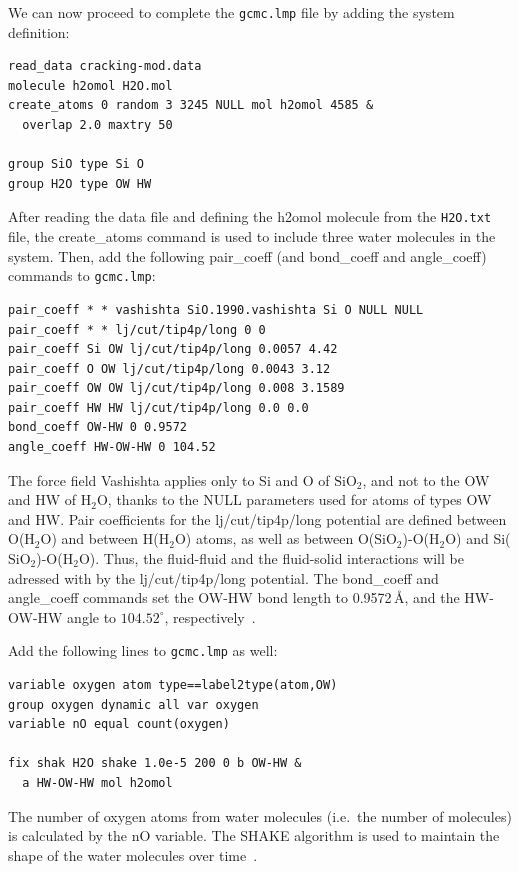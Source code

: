 \documentclass[9pt,tutorial]{livecoms}
\newcommand{\lmpcmd}[1]{\hspace{0pt}\colorbox{listing}{\textcolor{command}{\small{#1}}}\hspace{0pt}} %
\newcommand{\flecmd}[1]{\textcolor{command}{\texttt{#1}}} %
\begin{document}
We can now proceed to complete the \flecmd{gcmc.lmp} file by adding the system definition:
\begin{lstlisting}
read_data cracking-mod.data
molecule h2omol H2O.mol
create_atoms 0 random 3 3245 NULL mol h2omol 4585 &
  overlap 2.0 maxtry 50

group SiO type Si O
group H2O type OW HW
\end{lstlisting}
After reading the data file and defining the \lmpcmd{h2omol} molecule from the \flecmd{H2O.txt}
file, the \lmpcmd{create\_atoms} command is used to include three water molecules
in the system.  Then, add the following \lmpcmd{pair\_coeff} (and
\lmpcmd{bond\_coeff} and \lmpcmd{angle\_coeff}) commands
to \flecmd{gcmc.lmp}:
\begin{lstlisting}
pair_coeff * * vashishta SiO.1990.vashishta Si O NULL NULL
pair_coeff * * lj/cut/tip4p/long 0 0
pair_coeff Si OW lj/cut/tip4p/long 0.0057 4.42
pair_coeff O OW lj/cut/tip4p/long 0.0043 3.12
pair_coeff OW OW lj/cut/tip4p/long 0.008 3.1589
pair_coeff HW HW lj/cut/tip4p/long 0.0 0.0
bond_coeff OW-HW 0 0.9572
angle_coeff HW-OW-HW 0 104.52
\end{lstlisting}
The force field Vashishta applies only to \lmpcmd{Si} and \lmpcmd{O} of $\text{SiO}_2$,
and not to the \lmpcmd{OW} and \lmpcmd{HW} of $\text{H}_2\text{O}$, thanks to the \lmpcmd{NULL} parameters
used for atoms of types \lmpcmd{OW} and \lmpcmd{HW}.  Pair coefficients for the \lmpcmd{lj/cut/tip4p/long}
potential are defined between O($\text{H}_2\text{O}$) and between H($\text{H}_2\text{O}$)
atoms, as well as between O($\text{SiO}_2$)-O($\text{H}_2\text{O}$) and
Si($\text{SiO}_2$)-O($\text{H}_2\text{O}$). Thus,  the fluid-fluid and the
fluid-solid interactions will be adressed with by the \lmpcmd{lj/cut/tip4p/long} potential.
The \lmpcmd{bond\_coeff} and \lmpcmd{angle\_coeff} commands set the \lmpcmd{OW-HW}
bond length to 0.9572\,\AA, and the \lmpcmd{HW-OW-HW}
angle to $104.52^\circ$, respectively~\cite{abascal2005general}.

Add the following lines to \flecmd{gcmc.lmp} as well:
\begin{lstlisting}
variable oxygen atom type==label2type(atom,OW)
group oxygen dynamic all var oxygen
variable nO equal count(oxygen)

fix shak H2O shake 1.0e-5 200 0 b OW-HW &
  a HW-OW-HW mol h2omol
\end{lstlisting}
The number of oxygen atoms from water molecules (i.e.~the number of molecules)
is calculated by the \lmpcmd{nO} variable.  The SHAKE algorithm is used to
maintain the shape of the water molecules over time~\cite{ryckaert1977numerical, andersen1983rattle}.
\end{document}
